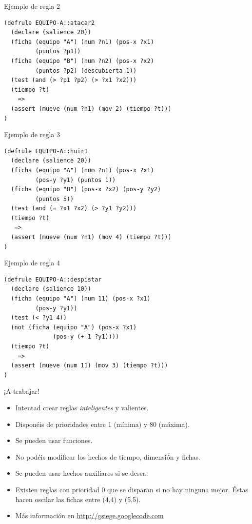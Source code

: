 \documentclass[smaller,spanish,xcolor=svgnames]{beamer}
\begin{document}
\begin{frame}[fragile]{Ejemplo de regla 2}
\begin{verbatim}
(defrule EQUIPO-A::atacar2
  (declare (salience 20))
  (ficha (equipo "A") (num ?n1) (pos-x ?x1)
         (puntos ?p1))
  (ficha (equipo "B") (num ?n2) (pos-x ?x2)
         (puntos ?p2) (descubierta 1))
  (test (and (> ?p1 ?p2) (> ?x1 ?x2)))
  (tiempo ?t)
    =>
  (assert (mueve (num ?n1) (mov 2) (tiempo ?t)))
)
\end{verbatim}
\end{frame}

\begin{frame}[fragile]{Ejemplo de regla 3}
\begin{verbatim}
(defrule EQUIPO-A::huir1
  (declare (salience 20))
  (ficha (equipo "A") (num ?n1) (pos-x ?x1)
         (pos-y ?y1) (puntos 1))
  (ficha (equipo "B") (pos-x ?x2) (pos-y ?y2)
         (puntos 5))
  (test (and (= ?x1 ?x2) (> ?y1 ?y2)))
  (tiempo ?t)
   =>
  (assert (mueve (num ?n1) (mov 4) (tiempo ?t)))
)
\end{verbatim}
\end{frame}

\begin{frame}[fragile]{Ejemplo de regla 4}
\begin{verbatim}
(defrule EQUIPO-A::despistar
  (declare (salience 10))
  (ficha (equipo "A") (num 11) (pos-x ?x1)
         (pos-y ?y1))
  (test (< ?y1 4))
  (not (ficha (equipo "A") (pos-x ?x1)
              (pos-y (+ 1 ?y1))))
  (tiempo ?t)
    =>
  (assert (mueve (num 11) (mov 3) (tiempo ?t)))
)
\end{verbatim}
\end{frame}

\begin{frame}{¡A trabajar!}
  \begin{itemize}
  \item Intentad crear reglas \textit{inteligentes} y valientes.
  \item Disponéis de prioridades entre 1 (mínima) y 80 (máxima).
  \item Se pueden usar funciones.
  \item No podéis modificar los hechos de tiempo, dimensión y fichas.
  \item Se pueden usar hechos auxiliares si se desea.
  \item Existen reglas con prioridad 0 que se disparan si no hay ninguna
    mejor. Éstas hacen oscilar las fichas entre (4,4) y (5,5).
  \item Más información en \url{http://gsiege.googlecode.com}
  \end{itemize}
\end{frame}

\licencia
\end{document}
